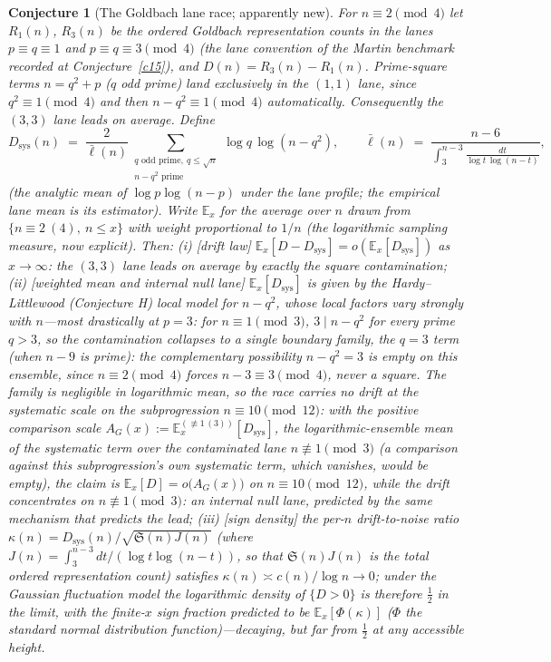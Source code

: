 \documentclass[11pt]{article}
\newtheorem{conjecture}{Conjecture}
\theoremstyle{definition}
\newcommand{\SG}{\mathfrak S}
\begin{document}
\setcounter{conjecture}{3}%
\begin{conjecture}[The Goldbach lane race; apparently new]\label{c25}
For $n\equiv2\pmod4$ let $R_1(n)$, $R_3(n)$ be the ordered Goldbach
representation counts in the lanes $p\equiv q\equiv1$ and
$p\equiv q\equiv3\pmod4$ (the lane convention of the Martin benchmark recorded at Conjecture~\ref{c15}), and
$D(n)=R_3(n)-R_1(n)$.  Prime-square terms $n=q^2+p$ ($q$ odd prime)
land \emph{exclusively} in the $(1,1)$ lane, since
$q^2\equiv1\pmod4$ and then $n-q^2\equiv1\pmod4$ automatically.
Consequently the $(3,3)$ lane leads on average. Define
\[
D_{\mathrm{sys}}(n)\;=\;\frac{2}{\bar\ell(n)}
\sum_{\substack{q \text{ odd prime},\ q\le\sqrt n\\ n-q^2 \text{ prime}}}
\log q\,\log(n-q^2),
\qquad
\bar\ell(n)\;=\;\frac{n-6}{\displaystyle\int_3^{n-3}
\frac{dt}{\log t\,\log(n-t)}},
\]
(the analytic mean of $\log p\log(n-p)$ under the lane profile; the
empirical lane mean is its estimator).  Write $\mathbb E_x$ for the
average over $n$ drawn from $\{n\equiv2\ (4),\ n\le x\}$ with weight
proportional to $1/n$ (the logarithmic sampling measure, now
explicit).  Then:
\emph{(i)} [drift law]
$\mathbb E_x[D-D_{\mathrm{sys}}]=o(\mathbb E_x[D_{\mathrm{sys}}])$ as
$x\to\infty$: the $(3,3)$ lane leads on average by exactly the square
contamination;
\emph{(ii)} [weighted mean and internal null lane]
$\mathbb E_x[D_{\mathrm{sys}}]$ is given by the Hardy--Littlewood
(Conjecture H) local model for $n-q^2$, whose local factors vary
strongly with $n$---most drastically at $p=3$: for $n\equiv1\pmod3$, $3\mid
n-q^2$ for \emph{every} prime
$q>3$, so the contamination collapses to a single boundary family, the $q=3$ term (when $n-9$ is prime): the complementary possibility $n-q^2=3$ is empty on this ensemble, since $n\equiv2\pmod4$ forces $n-3\equiv3\pmod4$, never a square.  The family is negligible in logarithmic mean, so the race carries no drift at the
systematic scale on the subprogression $n\equiv10\pmod{12}$: with the
positive comparison scale
$A_G(x):=\mathbb E_x^{(\not\equiv1\,(3))}[D_{\mathrm{sys}}]$, the
logarithmic-ensemble mean of the systematic term over the
contaminated lane $n\not\equiv1\pmod3$ (a comparison against this
subprogression's own systematic term, which vanishes, would be
empty), the claim is $\mathbb E_x[D]=o\bigl(A_G(x)\bigr)$ on
$n\equiv10\pmod{12}$, while the drift
concentrates on $n\not\equiv1\pmod3$: an internal null lane,
predicted by the same mechanism that predicts the lead;
\emph{(iii)} [sign density] the per-$n$ drift-to-noise ratio
$\kappa(n)=D_{\mathrm{sys}}(n)\big/\sqrt{\SG(n)J(n)}$
(where $J(n)=\int_3^{n-3}dt/(\log t\log(n-t))$, so that
$\SG(n)J(n)$ is the total ordered representation count) satisfies
$\kappa(n)\asymp c(n)/\log n\to0$; under the Gaussian fluctuation
model the logarithmic density of $\{D>0\}$ is therefore $\tfrac12$ in
the limit, with the finite-$x$ sign fraction predicted to be
$\mathbb E_x[\Phi(\kappa)]$ ($\Phi$ the standard normal distribution
function)---decaying, but far from $\tfrac12$ at any accessible
height.
\end{conjecture}
\end{document}

